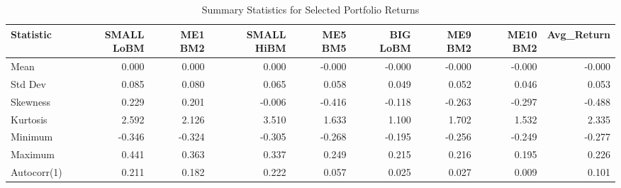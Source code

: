 \begin{table}
\caption{Summary Statistics for Selected Portfolio Returns}
\label{tab:summary_stats_returns}
\begin{tabular}{lrrrrrrrr}
\toprule
Statistic & SMALL LoBM & ME1 BM2 & SMALL HiBM & ME5 BM5 & BIG LoBM & ME9 BM2 & ME10 BM2 & Avg_Return \\
\midrule
Mean & 0.000 & 0.000 & 0.000 & -0.000 & -0.000 & -0.000 & -0.000 & -0.000 \\
Std Dev & 0.085 & 0.080 & 0.065 & 0.058 & 0.049 & 0.052 & 0.046 & 0.053 \\
Skewness & 0.229 & 0.201 & -0.006 & -0.416 & -0.118 & -0.263 & -0.297 & -0.488 \\
Kurtosis & 2.592 & 2.126 & 3.510 & 1.633 & 1.100 & 1.702 & 1.532 & 2.335 \\
Minimum & -0.346 & -0.324 & -0.305 & -0.268 & -0.195 & -0.256 & -0.249 & -0.277 \\
Maximum & 0.441 & 0.363 & 0.337 & 0.249 & 0.215 & 0.216 & 0.195 & 0.226 \\
Autocorr(1) & 0.211 & 0.182 & 0.222 & 0.057 & 0.025 & 0.027 & 0.009 & 0.101 \\
\bottomrule
\end{tabular}
\end{table}
